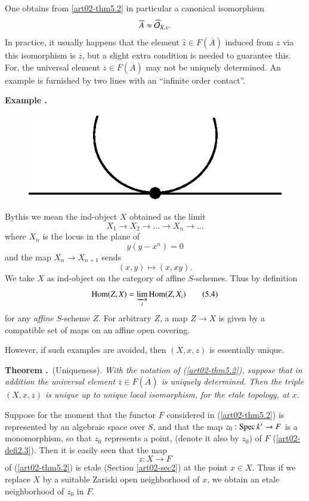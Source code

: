One obtains from \eqref{art02-thm5.2} in particular a canonical isomorphism 
$$
\overline{A}\approx \widehat{\mathcal{O}}_{X,x}.
$$
In practice, it usually happens that the element $\widehat{z}\in F(\overline{A})$ induced from $z$ via this isomorphism is $\overline{z}$, but a slight extra condition is needed to guarantee this. For, the universal element $\overline{z}\in F(\overline{A})$ may not be uniquely determined. An example is furnished by two lines with an ``infinite order contact''.

\medskip
\noindent
{\bf Example .\label{art02-exam5.3}}
~

\begin{figure}[H]
\centering
\includegraphics{src/chap2/fig1.eps}
\end{figure}
By\pageoriginale this we mean the ind-object $X$ obtained as the limit
$$
X_{1}\to X_{2}\to\ldots\to X_{n}\to\ldots
$$
where $X_{n}$ is the locus in the plane of
$$
y(y-x^{n})=0
$$
and the map $X_{n}\to X_{n+1}$ sends
$$
(x,y)\mapsto (x,xy).
$$
We take $X$ as ind-object on the category of affine $S$-schemes. Thus by definition
\begin{equation*}
\operatorname{\mathrm{Hom}} (Z,X)=\varinjlim\limits_{i}\operatorname{\mathrm{Hom}} (Z,X_{i})\tag{5.4}\label{art02-eq5.4}
\end{equation*}
for any {\em affine} $S$-scheme $Z$. For arbitrary $Z$, a map $Z\to X$ is given by a compatible set of maps on an affine open covering.

However, if such examples are avoided, then $(X,x,z)$ is essentially unique.

\medskip
\noindent
{\bf Theorem .\label{art02-thm5.5}}~(Uniqueness).
{\em With the notation of (\ref{art02-thm5.2}), suppose that in addition the universal element $\overline{z}\in F(\overline{A})$ is uniquely determined. Then the triple $(X,x,z)$ is unique up to unique local isomorphism, for the etale topology, at $x$.}
\smallskip

Suppose for the moment that the functor $F$ considered in (\ref{art02-thm5.2}) is represented by an algebraic space over $S$, and that the map $z_{0}:\operatorname{Spec} k'\to F$ is a monomorphism, so that $z_{0}$ represents a point, (denote it also by $z_{0}$) of $F$ (\ref{art02-defi2.3}). Then it is easily seen that the map
$$
z:X\to F
$$
of (\ref{art02-thm5.2}) is etale (Section \ref{art02-sec2}) at the point $x\in X$. Thus if we replace $X$ by a suitable Zariski open neighborhood of $x$, we obtain an etale neighborhood of $z_{0}$ in $F$.

